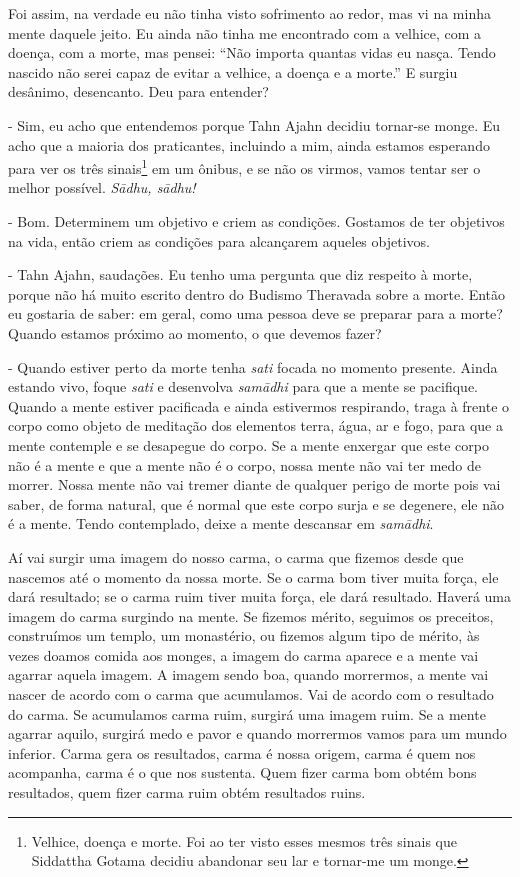 Foi assim, na verdade eu não tinha visto sofrimento ao redor, mas vi
na minha mente daquele jeito. Eu ainda não tinha me encontrado com a
velhice, com a doença, com a morte, mas pensei: “Não importa quantas
vidas eu nasça. Tendo nascido não serei capaz de evitar a velhice, a
doença e a morte.” E surgiu desânimo, desencanto. Deu para entender?

- Sim, eu acho que entendemos porque Tahn Ajahn decidiu
tornar-se monge. Eu acho que a maioria dos praticantes, incluindo a
mim, ainda estamos esperando para ver os três sinais\footnote{Velhice,
doença e morte. Foi ao ter visto esses mesmos três sinais que Siddattha
Gotama decidiu abandonar seu lar e tornar-me um monge. } em um ônibus,
e se não os virmos, vamos tentar ser o melhor possível.
\textit{Sādhu, sādhu!}

- Bom. Determinem um objetivo e criem as condições. Gostamos de
ter objetivos na vida, então criem as condições para alcançarem aqueles
objetivos. 

- Tahn Ajahn, saudações. Eu tenho uma pergunta que diz respeito à
morte, porque não há muito escrito dentro do Budismo Theravada sobre a
morte. Então eu gostaria de saber: em geral, como uma pessoa deve se
preparar para a morte? Quando estamos próximo ao momento, o que devemos
fazer?

- Quando estiver perto da morte tenha \textit{sati }focada no
momento presente. Ainda estando vivo, foque \textit{sati }e desenvolva
\textit{samādhi }para que a mente se pacifique. Quando a mente
estiver pacificada e ainda estivermos respirando, traga à frente o
corpo como objeto de meditação dos elementos terra, água, ar e fogo,
para que a mente contemple e se desapegue do corpo. Se a mente enxergar
que este corpo não é a mente e que a mente não é o corpo, nossa mente
não vai ter medo de morrer. Nossa mente não vai tremer diante de
qualquer perigo de morte pois vai saber, de forma natural, que é normal
que este corpo surja e se degenere, ele não é a mente. Tendo
contemplado, deixe a mente descansar em \textit{samādhi}.

Aí vai surgir uma imagem do nosso carma, o carma que fizemos desde
que nascemos até o momento da nossa morte. Se o carma bom tiver muita
força, ele dará resultado; se o carma ruim tiver muita força, ele dará
resultado. Haverá uma imagem do carma surgindo na mente. Se fizemos
mérito, seguimos os preceitos, construímos um templo, um monastério, ou
fizemos algum tipo de mérito, às vezes doamos comida aos monges, a
imagem do carma aparece e a mente vai agarrar aquela imagem. A imagem
sendo boa, quando morrermos, a mente vai nascer de acordo com o carma
que acumulamos. Vai de acordo com o resultado do carma. Se acumulamos
carma ruim, surgirá uma imagem ruim. Se a mente agarrar aquilo, surgirá
medo e pavor e quando morrermos vamos para um mundo inferior. Carma
gera os resultados, carma é nossa origem, carma é quem nos acompanha,
carma é o que nos sustenta. Quem fizer carma bom obtém bons resultados,
quem fizer carma ruim obtém resultados ruins.

